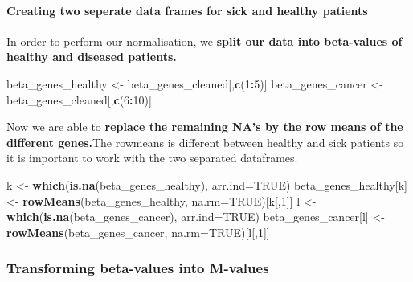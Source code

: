 \documentclass[]{article}
\newenvironment{Shaded}{\begin{snugshade}}{\end{snugshade}}
\newcommand{\KeywordTok}[1]{\textcolor[rgb]{0.13,0.29,0.53}{\textbf{#1}}}
\newcommand{\DataTypeTok}[1]{\textcolor[rgb]{0.13,0.29,0.53}{#1}}
\newcommand{\DecValTok}[1]{\textcolor[rgb]{0.00,0.00,0.81}{#1}}
\newcommand{\StringTok}[1]{\textcolor[rgb]{0.31,0.60,0.02}{#1}}
\newcommand{\OtherTok}[1]{\textcolor[rgb]{0.56,0.35,0.01}{#1}}
\newcommand{\OperatorTok}[1]{\textcolor[rgb]{0.81,0.36,0.00}{\textbf{#1}}}
\newcommand{\NormalTok}[1]{#1}
\let\oldparagraph\paragraph
\renewcommand{\paragraph}[1]{\oldparagraph{#1}\mbox{}}
\begin{document}
\paragraph{Creating two seperate data frames for sick and healthy
patients}\label{creating-two-seperate-data-frames-for-sick-and-healthy-patients}

In order to perform our normalisation, we \textbf{split our data into
beta-values of healthy and diseased patients.}

\begin{Shaded}
\begin{Highlighting}[]
\NormalTok{beta_genes_healthy <-}\StringTok{ }\NormalTok{beta_genes_cleaned[,}\KeywordTok{c}\NormalTok{(}\DecValTok{1}\OperatorTok{:}\DecValTok{5}\NormalTok{)]}
\NormalTok{beta_genes_cancer <-}\StringTok{ }\NormalTok{beta_genes_cleaned[,}\KeywordTok{c}\NormalTok{(}\DecValTok{6}\OperatorTok{:}\DecValTok{10}\NormalTok{)]}
\end{Highlighting}
\end{Shaded}

Now we are able to \textbf{replace the remaining NA's by the row means
of the different genes.}The rowmeans is different between healthy and
sick patients so it is important to work with the two separated
dataframes.

\begin{Shaded}
\begin{Highlighting}[]
\NormalTok{k <-}\StringTok{ }\KeywordTok{which}\NormalTok{(}\KeywordTok{is.na}\NormalTok{(beta_genes_healthy), }\DataTypeTok{arr.ind=}\OtherTok{TRUE}\NormalTok{)}
\NormalTok{beta_genes_healthy[k] <-}\StringTok{ }\KeywordTok{rowMeans}\NormalTok{(beta_genes_healthy, }\DataTypeTok{na.rm=}\OtherTok{TRUE}\NormalTok{)[k[,}\DecValTok{1}\NormalTok{]]}
\NormalTok{l <-}\StringTok{ }\KeywordTok{which}\NormalTok{(}\KeywordTok{is.na}\NormalTok{(beta_genes_cancer), }\DataTypeTok{arr.ind=}\OtherTok{TRUE}\NormalTok{)}
\NormalTok{beta_genes_cancer[l] <-}\StringTok{ }\KeywordTok{rowMeans}\NormalTok{(beta_genes_cancer, }\DataTypeTok{na.rm=}\OtherTok{TRUE}\NormalTok{)[l[,}\DecValTok{1}\NormalTok{]]}
\end{Highlighting}
\end{Shaded}

\subsubsection{Transforming beta-values into
M-values}\label{transforming-beta-values-into-m-values}
\end{document}
